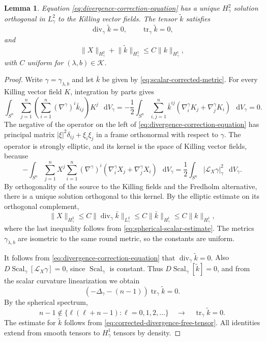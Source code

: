 \documentclass[11pt]{article}
\numberwithin{equation}{section}
\newtheorem{lemma}[theorem]{Lemma}
\theoremstyle{remark}
\newcommand{\Sph}{S}
\newcommand{\norm}[1]{\lVert #1\rVert}
\newcommand{\dd}{\mathop{}\!\mathrm{d}}
\begin{document}
\begin{lemma}\label{lem:divergence-correction}
Equation  \eqref{eq:divergence-correction-equation} has a unique
\(H^2_\gamma\) solution orthogonal in \(L^2_\gamma\) to the Killing vector
fields. The tensor \(\widetilde k\) satisfies
\[
 \operatorname{div}_\gamma \widetilde k=0,\qquad \operatorname{tr}_\gamma \widetilde k=0,
\]
and
\begin{equation}\label{eq:divergence-correction-bound}
 \norm{X}_{H^2_\gamma}+\norm{\widetilde k}_{H^1_\gamma}
 \le C\norm{k}_{H^1_\gamma},
\end{equation}
with \(C\) uniform for \((\lambda,b)\in\mathcal K\).
\end{lemma}

\begin{proof}
Write \(\gamma=\gamma_{\lambda,b}\) and let \(\bar k\) be given by
\eqref{eq:scalar-corrected-metric}. For every Killing vector field \(K\),
integration by parts gives
\[
 \int_{\Sph^n}\sum_{j=1}^n
 \left(\sum_{i=1}^n(\nabla^\gamma)^i\bar k_{ij}\right)K^j\,\dd V_\gamma
 =-\frac12\int_{\Sph^n}\sum_{i,j=1}^n
 \bar k^{ij}(\nabla^\gamma_iK_j+\nabla^\gamma_jK_i)\,\dd V_\gamma=0.
\]
The negative of the operator on the left of
\eqref{eq:divergence-correction-equation} has principal matrix \(|\xi|^2\delta_{ij}+\xi_i\xi_j\)
in a frame orthonormal with respect to \(\gamma\). The operator is strongly elliptic, and its kernel is
the space of Killing vector fields, because
\[
 -\int_{\Sph^n}\sum_{j=1}^nX^j
 \sum_{i=1}^n(\nabla^\gamma)^i
 (\nabla^\gamma_iX_j+\nabla^\gamma_jX_i)\,\dd V_\gamma
 =\frac12\int_{\Sph^n}|\mathcal L_X\gamma|_\gamma^2\,\dd V_\gamma.
\]
{By orthogonality of the source to the Killing fields and the
Fredholm alternative, there is a unique solution orthogonal to this
kernel.  By the elliptic estimate on its orthogonal complement,}
\[
 \norm{X}_{H^2_\gamma}
 \le C\norm{\operatorname{div}_\gamma\bar k}_{L^2_\gamma}
 \le C\norm{\bar k}_{H^1_\gamma}
 \le C\norm{k}_{H^1_\gamma},
\]
where the last inequality follows from
\eqref{eq:spherical-scalar-estimate}. The metrics \(\gamma_{\lambda,b}\)
are isometric to the same round metric, so the constants are uniform.

{It follows from \eqref{eq:divergence-correction-equation}
that \(\operatorname{div}_\gamma \widetilde k=0\).} Also
\(D\!\operatorname{Scal}_\gamma[\mathcal L_X\gamma]=0\), since \(\operatorname{Scal}_\gamma\) is constant.
Thus \(D\!\operatorname{Scal}_\gamma[\widetilde k]=0\), and {from the scalar curvature
linearization we obtain}
\[
 (-\Delta_\gamma-(n-1))\operatorname{tr}_\gamma \widetilde k=0.
\]
{By the spherical spectrum,}
\[
 n-1\notin\{\ell(\ell+n-1):\ell=0,1,2,\ldots\}
 \quad\to\quad \operatorname{tr}_\gamma \widetilde k=0.
\]
The estimate for \(\widetilde k\) follows from
\eqref{eq:corrected-divergence-free-tensor}.
All identities extend from smooth tensors to \(H^1_\gamma\) tensors
by density.
\end{proof}
\end{document}
